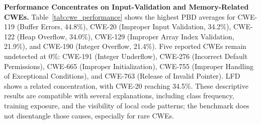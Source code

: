 \documentclass[lettersize,journal]{IEEEtran}
\begin{document}
\begin{table}[!t]
\centering%
\caption{Micro/macro Top-5 exact-inclusion accuracy across \gls{CWE} types. Gaps are computed from unrounded three-run means and may differ by 0.1 point from subtracting the displayed values.}
\label{tab:micro_macro_analysis}
\small
\renewcommand{\arraystretch}{1.1}
\setlength{\tabcolsep}{2pt}
\end{table}

\textbf{Performance Concentrates on Input-Validation and Memory-Related CWEs.} Table~\ref{tab:cwe_performance} shows the highest PBD averages for CWE-119 (Buffer Errors, 44.8\%), CWE-20 (Improper Input Validation, 34.2\%), CWE-122 (Heap Overflow, 34.0\%), CWE-129 (Improper Array Index Validation, 21.9\%), and CWE-190 (Integer Overflow, 21.4\%). Five reported CWEs remain undetected at 0\%: CWE-191 (Integer Underflow), CWE-276 (Incorrect Default Permissions), CWE-665 (Improper Initialization), CWE-755 (Improper Handling of Exceptional Conditions), and CWE-763 (Release of Invalid Pointer). LFD shows a related concentration, with CWE-20 reaching 34.5\%. These descriptive results are compatible with several explanations, including class frequency, training exposure, and the visibility of local code patterns; the benchmark does not disentangle those causes, especially for rare CWEs.
\end{document}
